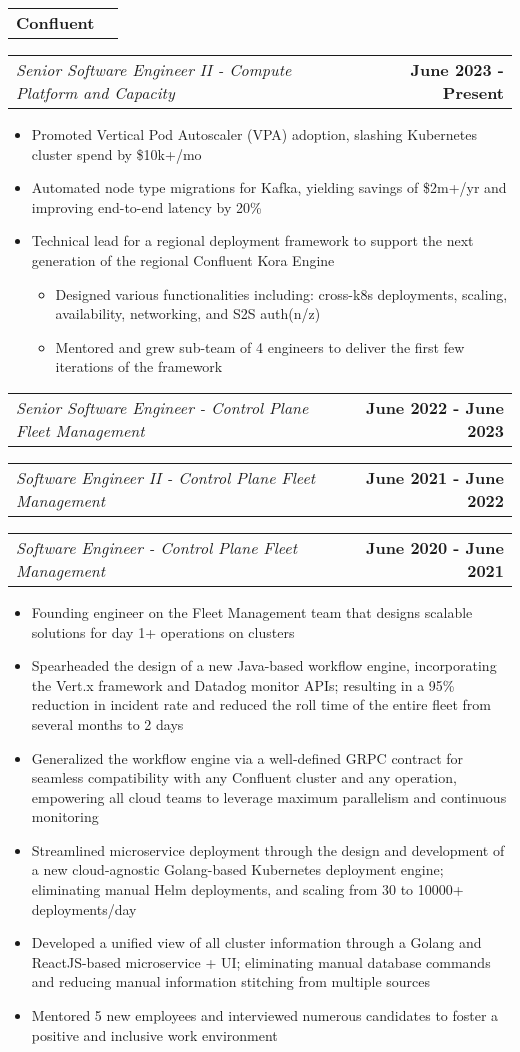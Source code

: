\documentclass[letterpaper,10.8pt]{article}
\makeatletter
\newcommand{\resumeItemOne}[1]{
  \item[$\circ$]\small{{#1 \vspace{-2pt}}
  }
}
\newcommand{\resumeSubheadingCompanyOnly}[1]{
  \vspace{-2pt}\item[$ $]
    \begin{tabular*}{0.97\textwidth}{l@{\extracolsep{\fill}}r}
      \textbf{#1} \\
    \end{tabular*}
  \vspace{-7pt}
}
\newcommand{\resumeSubheadingTitleOnly}[2]{
  \vspace{-2pt}\item[$ $]
    \begin{tabular*}{0.97\textwidth}{l@{\extracolsep{\fill}}r}
      \textit{\small #1} & \textbf{\small #2} \\
    \end{tabular*}
  \vspace{-7pt}
}
\newcommand{\resumeItemListStart}{\begin{itemize}}
\newcommand{\resumeItemListEnd}{\end{itemize}\vspace{-5pt}}
\makeatother
\begin{document}
    \resumeSubheadingCompanyOnly {Confluent}
    \resumeSubheadingTitleOnly
    {Senior Software Engineer II - Compute Platform and Capacity}{June 2023 - Present}
    \resumeItemListStart
      \resumeItemOne{Promoted Vertical Pod Autoscaler (VPA) adoption, slashing Kubernetes cluster spend by \$10k+/mo}
      \resumeItemOne{Automated node type migrations for Kafka, yielding savings of \$2m+/yr and improving end-to-end latency by 20\%} 
      \resumeItemOne{Technical lead for a regional deployment framework to support the next generation of the regional Confluent Kora Engine}
      \resumeItemListStart
        \resumeItemOne{Designed various functionalities including: cross-k8s deployments, scaling, availability, networking, and S2S auth(n/z)}
        \resumeItemOne{Mentored and grew sub-team of 4 engineers to deliver the first few iterations of the framework}
        \resumeItemListEnd
    \resumeItemListEnd
    \resumeSubheadingTitleOnly
    {Senior Software Engineer - Control Plane Fleet Management}{June 2022 - June 2023}
    \resumeSubheadingTitleOnly
    {Software Engineer II - Control Plane Fleet Management}{June 2021 - June 2022}
    \resumeSubheadingTitleOnly
    {Software Engineer - Control Plane Fleet Management}{June 2020 - June 2021}
    \resumeItemListStart
      \resumeItemOne{Founding engineer on the Fleet Management team that designs scalable solutions for day 1+ operations on clusters}
      \resumeItemOne{Spearheaded the design of a new Java-based workflow engine, incorporating the Vert.x framework and Datadog monitor APIs; resulting in a 95\% reduction in incident rate and reduced the roll time of the entire fleet from several months to 2 days}
      \resumeItemOne{Generalized the workflow engine via a well-defined GRPC contract for seamless compatibility with any Confluent cluster and any operation, empowering all cloud teams to leverage maximum parallelism and continuous monitoring}
      \resumeItemOne{Streamlined microservice deployment through the design and development of a new cloud-agnostic Golang-based Kubernetes deployment engine; eliminating manual Helm deployments, and scaling from 30 to 10000+ deployments/day}
      \resumeItemOne{Developed a unified view of all cluster information through a Golang and ReactJS-based microservice + UI; eliminating manual database commands and reducing manual information stitching from multiple sources}
      \resumeItemOne{Mentored 5 new employees and interviewed numerous candidates to foster a positive and inclusive work environment}
  \resumeItemListEnd
\end{document}
